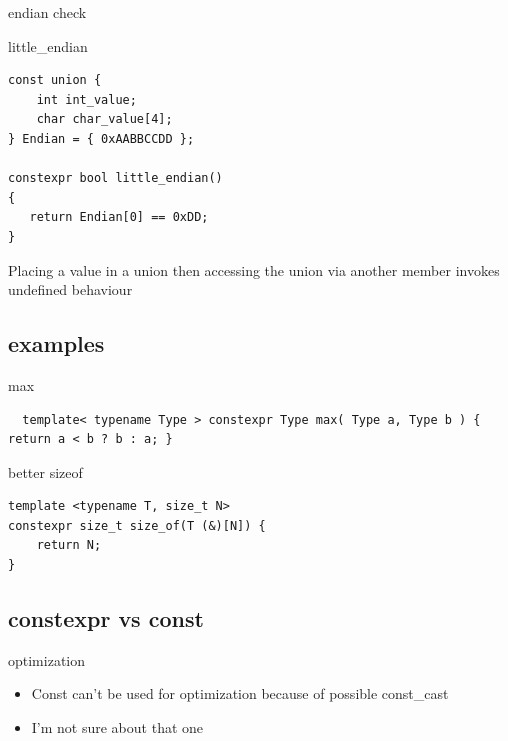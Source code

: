 \documentclass{beamer}
\begin{document}
\begin{frame}{endian check}
  \begin{block}{little\_endian}
\begin{verbatim}
const union {
    int int_value;
    char char_value[4];
} Endian = { 0xAABBCCDD };

constexpr bool little_endian()
{
   return Endian[0] == 0xDD;
}

\end{verbatim}
Placing a value in a union then accessing the union via another
member invokes undefined behaviour
  \end{block}
\end{frame}

\subsection{examples}
\begin{frame}{max}
\begin{verbatim}
  template< typename Type > constexpr Type max( Type a, Type b ) { return a < b ? b : a; }
\end{verbatim}
\end{frame}

\begin{frame}{better sizeof}
  \begin{block}{}
\begin{verbatim}
template <typename T, size_t N>
constexpr size_t size_of(T (&)[N]) {
    return N;
}
\end{verbatim}
  \end{block}
\end{frame}

\subsection{constexpr vs const}
\begin{frame}{optimization}
  \begin{block}{}
    \begin{itemize}
    \item Const can't be used for optimization because of possible const\_cast
    \item I'm not sure about that one
    \end{itemize}
  \end{block}
\end{frame}
\end{document}
